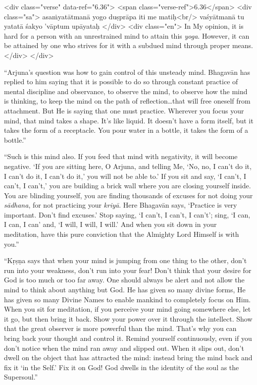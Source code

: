 \begin{html}
<div class="verse" data-ref="6.36">
  <span class="verse-ref">6.36</span>
  <div class="sa">
    asaṁyatātmanā yogo duṣprāpa iti me matiḥ<br/>
    vaśyātmanā tu yatatā śakyo ’vāptum upāyataḥ
  </div>
  <div class="en">
    In My opinion, it is hard for a person with an unrestrained mind to attain this \textit{yoga}. However, it can be attained by one who strives for it with a subdued mind through proper means.
  </div>
</div>
\end{html}


\enquote{Arjuna’s question was how to gain control of this unsteady mind. Bhagavān has replied to him saying that it is possible to do so through constant practice of mental discipline and observance, to observe the mind, to observe how the mind is thinking, to keep the mind on the path of reflection\ldots that will free oneself from attachment. But He is saying that one must practice. Wherever you focus your mind, that mind takes a shape. It’s like liquid. It doesn’t have a form itself, but it takes the form of a receptacle. You pour water in a bottle, it takes the form of a bottle.}

\enquote{Such is this mind also. If you feed that mind with negativity, it will become negative. \enquote{If you are sitting here, O Arjuna, and telling Me, ‘No, no, I can’t do it, I can’t do it, I can’t do it,’ you will not be able to.} If you sit and say, \enquote{I can’t, I can’t, I can’t,} you are building a brick wall where you are closing yourself inside. You are blinding yourself, you are finding thousands of excuses for not doing your \textit{sādhana}, for not practicing your \textit{kriyā}. Here Bhagavān says, \enquote{Practice is very important. Don’t find excuses.} Stop saying, \enquote{I can’t, I can’t, I can’t}; sing, \enquote{I can, I can, I can} and, \enquote{I will, I will, I will.} And when you sit down in your meditation, have this pure conviction that the Almighty Lord Himself is with you.}

\enquote{Kṛṣṇa says that when your mind is jumping from one thing to the other, don’t run into your weakness, don’t run into your fear! Don’t think that your desire for God is too much or too far away. One should always be alert and not allow the mind to think about anything but God. He has given so many divine forms, He has given so many Divine Names to enable mankind to completely focus on Him. When you sit for meditation, if you perceive your mind going somewhere else, let it go, but then bring it back. Show your power over it through the intellect. Show that the great observer is more powerful than the mind. That’s why you can bring back your thought and control it. Remind yourself continuously, even if you don’t notice when the mind ran away and slipped out. When it slips out, don’t dwell on the object that has attracted the mind: instead bring the mind back and fix it \enquote{in the Self.} Fix it on God! God dwells in the identity of the soul as the Supersoul.}

